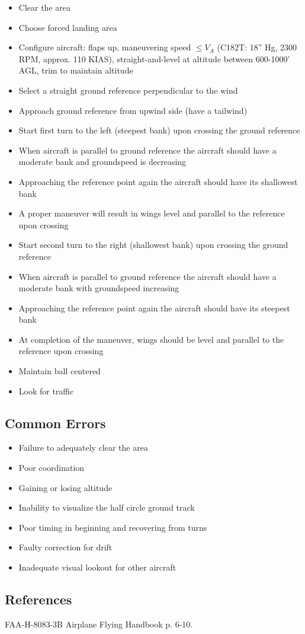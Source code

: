 \begin{itemize}
  \item Clear the area
  \item Choose forced landing area 
  \item Configure aircraft: flaps up, maneuvering speed $\leq V_A$
    (C182T: 18'' Hg, 2300 RPM, approx. 110 KIAS), straight-and-level at
    altitude between 600-1000' AGL, trim to maintain altitude
  \item Select a straight ground reference perpendicular to the wind
  \item Approach ground reference from upwind side (have a tailwind)
  \item Start first turn to the left (steepest bank) upon crossing the ground
    reference
  \item When aircraft is parallel to ground reference the aircraft should have
    a moderate bank and groundspeed is decreasing
  \item Approaching the reference point again the aircraft should have its
    shallowest bank
  \item A proper maneuver will result in wings level and parallel to the
    reference upon crossing
  \item Start second turn to the right (shallowest bank) upon crossing the
    ground reference
  \item When aircraft is parallel to ground reference the aircraft should have
    a moderate bank with groundspeed increasing
  \item Approaching the reference point again the aircraft should have its
    steepest bank
  \item At completion of the maneuver, wings should be level and parallel to
    the reference upon crossing
  \item Maintain ball centered
  \item Look for traffic
\end{itemize}

\subsection{Common Errors}

\begin{itemize}
  \item Failure to adequately clear the area
  \item Poor coordination
  \item Gaining or losing altitude
  \item Inability to visualize the half circle ground track
  \item Poor timing in beginning and recovering from turns
  \item Faulty correction for drift
  \item Inadequate visual lookout for other aircraft
\end{itemize}

\subsection{References}

FAA-H-8083-3B Airplane Flying Handbook p. 6-10.

